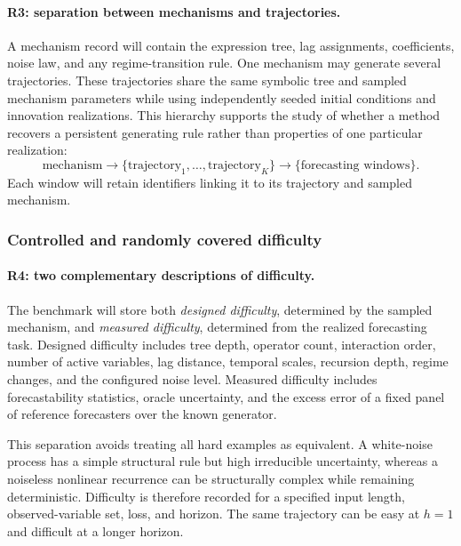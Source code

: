 \paragraph{R3: separation between mechanisms and trajectories.}
A mechanism record will contain the expression tree, lag assignments,
coefficients, noise law, and any regime-transition rule. One mechanism may
generate several trajectories. These trajectories share the same symbolic
tree and sampled mechanism parameters while using independently seeded initial
conditions and innovation realizations. This hierarchy supports the study of
whether a method recovers a persistent generating rule rather than properties
of one particular realization:
\[
\boxed{
\text{mechanism}
\longrightarrow
\{\text{trajectory}_{1},\ldots,\text{trajectory}_{K}\}
\longrightarrow
\{\text{forecasting windows}\}.
}
\]
Each window will retain identifiers linking it to its trajectory and sampled
mechanism.

\subsubsection{Controlled and randomly covered difficulty}

\paragraph{R4: two complementary descriptions of difficulty.}
The benchmark will store both \emph{designed difficulty}, determined by the
sampled mechanism, and \emph{measured difficulty}, determined from the
realized forecasting task. Designed difficulty includes tree depth, operator
count, interaction order, number of active variables, lag distance, temporal
scales, recursion depth, regime changes, and the configured noise level.
Measured difficulty includes forecastability statistics, oracle uncertainty,
and the excess error of a fixed panel of reference forecasters over the known
generator.

This separation avoids treating all hard examples as equivalent. A
white-noise process has a simple structural rule but high irreducible
uncertainty, whereas a noiseless nonlinear recurrence can be structurally
complex while remaining deterministic. Difficulty is therefore recorded for
a specified input length, observed-variable set, loss, and horizon. The same
trajectory can be easy at $h=1$ and difficult at a longer horizon.


